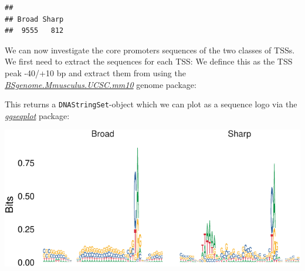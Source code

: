 \documentclass[9pt,a4paper,]{extarticle}
\newenvironment{Shaded}{\begin{snugshade}}{\end{snugshade}}
\newcommand{\KeywordTok}[1]{\textcolor[rgb]{0.13,0.29,0.53}{\textbf{{#1}}}}
\newcommand{\DataTypeTok}[1]{\textcolor[rgb]{0.13,0.29,0.53}{{#1}}}
\newcommand{\DecValTok}[1]{\textcolor[rgb]{0.00,0.00,0.81}{{#1}}}
\newcommand{\StringTok}[1]{\textcolor[rgb]{0.31,0.60,0.02}{{#1}}}
\newcommand{\NormalTok}[1]{{#1}}
\begin{document}
\begin{verbatim}
## 
## Broad Sharp 
##  9555   812
\end{verbatim}

We can now investigate the core promoters sequences of the two classes of TSSs. We first need to extract the sequences for each TSS: We defince this as the TSS peak -40/+10 bp and extract them from using the \emph{\href{https://bioconductor.org/packages/3.8/BSgenome.Mmusculus.UCSC.mm10}{BSgenome.Mmusculus.UCSC.mm10}} genome package:

\begin{Shaded}
\end{Shaded}

This returns a \texttt{DNAStringSet}-object which we can plot as a sequence logo \citep{Manetti2015} via the \emph{\href{https://CRAN.R-project.org/package=ggseqplot}{ggseqplot}} package\citep{Wagih2017}:

\begin{Shaded}
\end{Shaded}

\begin{center}\includegraphics{CAGEWorkflow_files/figure-latex/ggseqlogo-1} \end{center}
\end{document}
